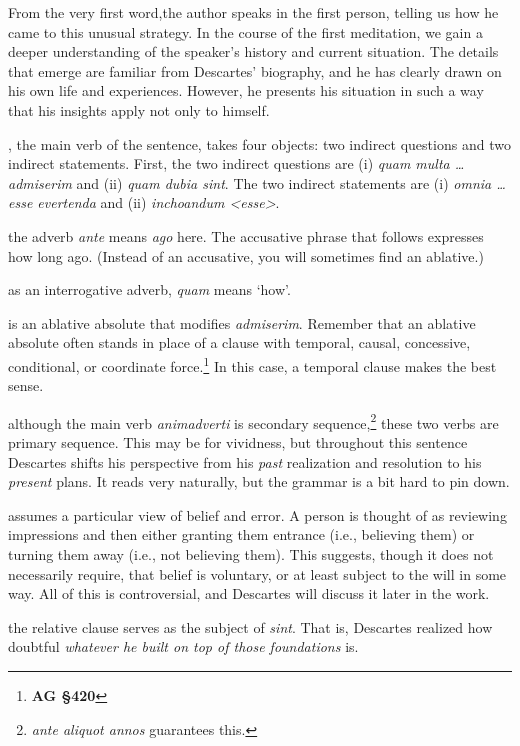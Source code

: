 From the very first word,the author speaks in the first person, telling us how he came to this unusual strategy. In the course of the first meditation, we gain a deeper understanding of the speaker's history and current situation. The details that emerge are familiar from Descartes' biography, and he has clearly drawn on his own life and experiences. However, he presents his situation in such a way that his insights apply not only to himself.

, the main verb of the sentence, takes four objects: two indirect questions and two indirect statements. First, the two indirect questions are (i) \textit{quam multa \dots admiserim} and (ii) \textit{quam dubia sint}. The two indirect statements are (i) \textit{omnia \dots esse evertenda} and (ii) \textit{inchoandum <esse>}.

 the adverb \textit{ante} means \textit{ago} here. The accusative phrase that follows expresses how long ago. (Instead of an accusative, you will sometimes find an ablative.)

 as an interrogative adverb, \textit{quam} means `how'.

 is an ablative absolute that modifies \textit{admiserim}. Remember that an ablative absolute often stands in place of a clause with temporal, causal, concessive, conditional, or coordinate force.\footnote{\textbf{AG §420}} In this case, a temporal clause makes the best sense.

 although the main verb \textit{animadverti} is secondary sequence,\footnote{\textit{ante aliquot annos} guarantees this.} these two verbs are primary sequence. This may be for vividness, but throughout this sentence Descartes shifts his perspective from his \textit{past} realization and resolution to his \textit{present} plans. It reads very naturally, but the grammar is a bit hard to pin down.

 assumes a particular view of belief and error. A person is thought of as reviewing impressions and then either granting them entrance (i.e., believing them) or turning them away (i.e., not believing them). This suggests, though it does not necessarily require, that belief is voluntary, or at least subject to the will in some way. All of this is controversial, and Descartes will discuss it later in the work.

 the relative clause serves as the subject of \textit{sint}. That is, Descartes realized how doubtful \textit{whatever he built on top of those foundations} is.

